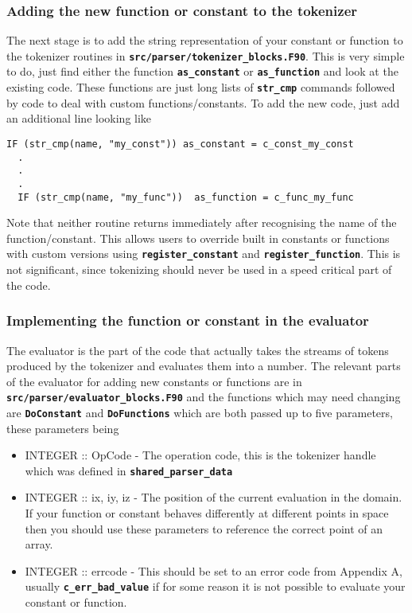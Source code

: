 \documentclass[12pt,a4paper]{article}
\newcommand{\simpleboxverbatim}{\begin{Verbatim}[obeytabs=true,frame=single,
  framerule=0.5mm,rulecolor=\color{warwickmid},formatcom=\color{black}]}
\newcommand{\inlinecode}[1]{{\color{warwickred} \bf\texttt{#1}}}
\begin{document}
\subsubsection{Adding the new function or constant to the tokenizer}
The next stage is to add the string representation of your constant or function
to the tokenizer routines in
\inlinecode{src/parser/tokenizer\_blocks.F90}. This is very simple to do, just
find either the function \inlinecode{as\_constant} or \inlinecode{as\_function} and
look at the existing code. These functions are just long lists of
\inlinecode{str\_cmp} commands followed by code to deal with custom
functions/constants. To add the new code, just add an additional line looking
like
\simpleboxverbatim
  IF (str_cmp(name, "my_const")) as_constant = c_const_my_const
  .
  .
  .
  IF (str_cmp(name, "my_func"))  as_function = c_func_my_func
\end{Verbatim}
Note that neither routine returns immediately after recognising the name of the
function/constant. This allows users to override built in constants or
functions with custom versions using \inlinecode{register\_constant} and
\inlinecode{register\_function}. This is not significant, since tokenizing should
never be used in a speed critical part of the code.

\subsubsection{Implementing the function or constant in the evaluator}
The evaluator is the part of the code that actually takes the streams of tokens
produced by the tokenizer and evaluates them into a number. The relevant parts
of the evaluator for adding new constants or functions are in
\inlinecode{src/parser/evaluator\_blocks.F90} and the functions which may need
changing are \inlinecode{DoConstant} and \inlinecode{DoFunctions} which are
both passed up to five parameters, these parameters being
\begin{itemize}
\item INTEGER :: OpCode - The operation code, this is the tokenizer handle
  which was defined in \inlinecode{shared\_parser\_data}
\item INTEGER :: ix, iy, iz - The position of the current evaluation in the
  domain. If your function or constant behaves differently at different points
  in space then you should use these parameters to reference the correct point
  of an array.
\item INTEGER :: errcode - This should be set to an error code from Appendix A,
  usually \inlinecode{c\_err\_bad\_value} if for some reason it is not possible to
  evaluate your constant or function.
\end{itemize}
\end{document}
